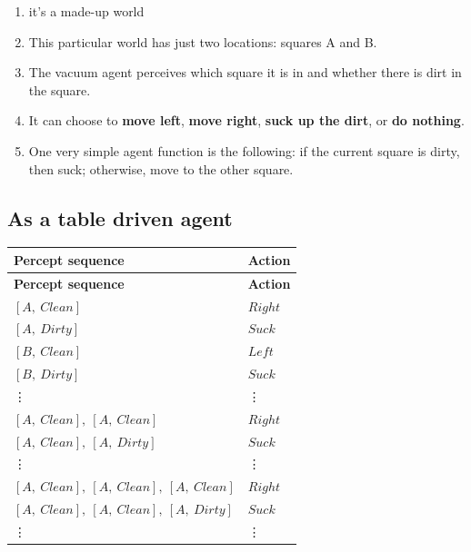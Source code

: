 \begin{enumerate}[itemsep=0.2cm]
    \item it’s a made-up world

    \item This particular world has just two locations: squares A and B. 
    
    \item The vacuum agent perceives which square it is in and whether there is dirt in the square. 
    
    \item It can choose to \textbf{move left}, \textbf{move right}, \textbf{suck up the dirt}, or \textbf{do nothing}.

    \item One very simple agent function is the following: if the current square is dirty, then suck; otherwise, move to the other square.

    
\end{enumerate}



\subsection{As a table driven agent}

\begin{customArrayStretch}{1.3}
\begin{longtable}{|l|l|}

\hline
\textbf{Percept sequence} & \textbf{Action} \\ \hline
\endhead

\hline
\textbf{Percept sequence} & \textbf{Action} \\ \hline
\endfirsthead

\hline\endfoot
\hline\endlastfoot


$[A, \ Clean]$ & $Right$ \\ 
$[A, \ Dirty]$ & $Suck$ \\ 
$[B, \ Clean]$ & $Left$ \\ 
$[B, \ Dirty]$ & $Suck$ \\ 

\vdots & \vdots \\

$[A, \ Clean],\ [A, \ Clean]$ & $Right$ \\ 
$[A, \ Clean],\ [A, \ Dirty]$ & $Suck$ \\ 

\vdots & \vdots \\

$[A, \ Clean],\ [A, \ Clean],\ [A, \ Clean]$ & $Right$ \\ 
$[A, \ Clean],\ [A, \ Clean],\ [A, \ Dirty]$ & $Suck$ \\ 

\vdots & \vdots \\

\end{longtable}
\end{customArrayStretch}





